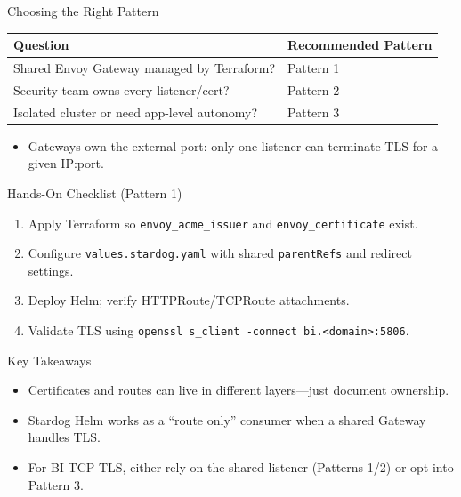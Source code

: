 \documentclass{beamer}
\begin{document}
\begin{frame}{Choosing the Right Pattern}
\begin{tabular}{|p{4cm}|p{6cm}|}
\hline
\textbf{Question} & \textbf{Recommended Pattern} \\
\hline
Shared Envoy Gateway managed by Terraform? & Pattern 1 \\
\hline
Security team owns every listener/cert? & Pattern 2 \\
\hline
Isolated cluster or need app-level autonomy? & Pattern 3 \\
\hline
\end{tabular}
\vspace{0.5cm}
\begin{itemize}
  \item Gateways own the external port: only one listener can terminate TLS for a given IP:port.
\end{itemize}
\end{frame}

\begin{frame}{Hands-On Checklist (Pattern 1)}
\begin{enumerate}
  \item Apply Terraform so \texttt{envoy\_acme\_issuer} and \texttt{envoy\_certificate} exist.
  \item Configure \texttt{values.stardog.yaml} with shared \texttt{parentRefs} and redirect settings.
  \item Deploy Helm; verify HTTPRoute/TCPRoute attachments.
  \item Validate TLS using \texttt{openssl s\_client -connect bi.<domain>:5806}.
\end{enumerate}
\end{frame}

\begin{frame}{Key Takeaways}
\begin{itemize}
  \item Certificates and routes can live in different layers—just document ownership.
  \item Stardog Helm works as a ``route only'' consumer when a shared Gateway handles TLS.
  \item For BI TCP TLS, either rely on the shared listener (Patterns 1/2) or opt into Pattern 3.
\end{itemize}
\end{frame}
\end{document}
